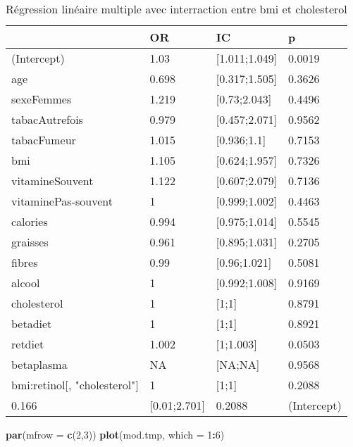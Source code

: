 \documentclass[]{article}
\newenvironment{Shaded}{\begin{snugshade}}{\end{snugshade}}
\newcommand{\KeywordTok}[1]{\textcolor[rgb]{0.13,0.29,0.53}{\textbf{#1}}}
\newcommand{\DataTypeTok}[1]{\textcolor[rgb]{0.13,0.29,0.53}{#1}}
\newcommand{\DecValTok}[1]{\textcolor[rgb]{0.00,0.00,0.81}{#1}}
\newcommand{\OperatorTok}[1]{\textcolor[rgb]{0.81,0.36,0.00}{\textbf{#1}}}
\newcommand{\NormalTok}[1]{#1}
\begin{document}
\begin{table}

\caption{\label{tab:unnamed-chunk-86}Régression linéaire multiple avec interraction entre bmi et cholesterol}
\centering
\begin{tabular}[t]{l|l|l|l}
\hline
  & OR & IC & p\\
\hline
\rowcolor[HTML]{BBD2E1}  (Intercept) & 1.03 & [1.011;1.049] & 0.0019\\
\hline
age & 0.698 & [0.317;1.505] & 0.3626\\
\hline
\rowcolor[HTML]{BBD2E1}  sexeFemmes & 1.219 & [0.73;2.043] & 0.4496\\
\hline
tabacAutrefois & 0.979 & [0.457;2.071] & 0.9562\\
\hline
\rowcolor[HTML]{BBD2E1}  tabacFumeur & 1.015 & [0.936;1.1] & 0.7153\\
\hline
bmi & 1.105 & [0.624;1.957] & 0.7326\\
\hline
\rowcolor[HTML]{BBD2E1}  vitamineSouvent & 1.122 & [0.607;2.079] & 0.7136\\
\hline
vitaminePas-souvent & 1 & [0.999;1.002] & 0.4463\\
\hline
\rowcolor[HTML]{BBD2E1}  calories & 0.994 & [0.975;1.014] & 0.5545\\
\hline
graisses & 0.961 & [0.895;1.031] & 0.2705\\
\hline
\rowcolor[HTML]{BBD2E1}  fibres & 0.99 & [0.96;1.021] & 0.5081\\
\hline
alcool & 1 & [0.992;1.008] & 0.9169\\
\hline
\rowcolor[HTML]{BBD2E1}  cholesterol & 1 & [1;1] & 0.8791\\
\hline
betadiet & 1 & [1;1] & 0.8921\\
\hline
\rowcolor[HTML]{BBD2E1}  retdiet & 1.002 & [1;1.003] & 0.0503\\
\hline
betaplasma & NA & [NA;NA] & 0.9568\\
\hline
\rowcolor[HTML]{BBD2E1}  bmi:retinol[, "cholesterol"] & 1 & [1;1] & 0.2088\\
\hline
0.166 & [0.01;2.701] & 0.2088 & (Intercept)\\
\hline
\end{tabular}
\end{table}

\begin{Shaded}
\begin{Highlighting}[]
\KeywordTok{par}\NormalTok{(}\DataTypeTok{mfrow =} \KeywordTok{c}\NormalTok{(}\DecValTok{2}\NormalTok{,}\DecValTok{3}\NormalTok{))}
\KeywordTok{plot}\NormalTok{(mod.tmp, }\DataTypeTok{which =} \DecValTok{1}\OperatorTok{:}\DecValTok{6}\NormalTok{)}
\end{Highlighting}
\end{Shaded}
\end{document}
